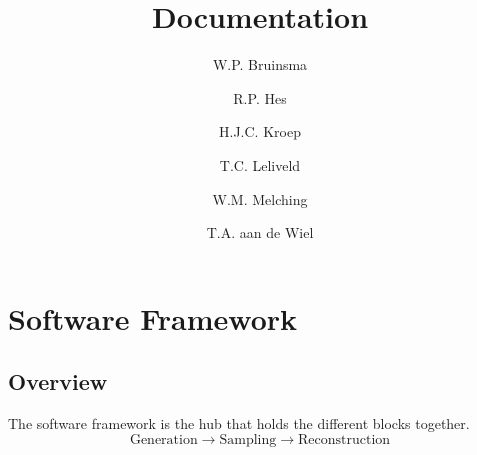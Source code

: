 \documentclass[report, oneside, a4paper, openany]{memoir}
\title{Documentation}
\author{W.P. Bruinsma \and R.P. Hes \and H.J.C. Kroep \and T.C. Leliveld \and W.M. Melching \and T.A. aan de Wiel}
\begin{document}
\chapter{Software Framework}

\section{Overview}

The software framework is the hub that holds the different blocks together.
$$
\text{Generation} \to \text{Sampling} \to \text{Reconstruction}
$$
\end{document}
